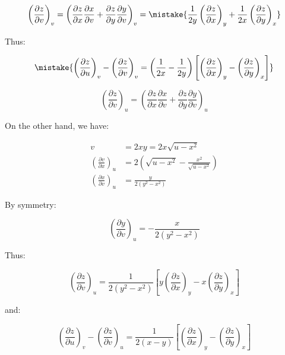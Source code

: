 \documentclass[12pt]{article}
\begin{document}

\begin{equation}
    \left( \frac{\partial z}{\partial v} \right)_{v} = \left( \frac{\partial z}{\partial x} \frac{\partial x}{\partial v} + \frac{\partial z}{\partial y} \frac{\partial y}{\partial v} \right)_{v} = \mistake{\frac{1}{2y} \left( \frac{\partial z}{\partial x} \right)_{y} + \frac{1}{2x} \left( \frac{\partial z}{\partial y} \right)_{x}}
\end{equation}

Thus:

\begin{equation}
    \mistake{\left( \frac{\partial z}{\partial u} \right)_{v} - \left( \frac{\partial z}{\partial v} \right)_{v} = \left( \frac{1}{2x} - \frac{1}{2y} \right) \left[ \left( \frac{\partial z}{\partial x} \right)_{y} - \left( \frac{\partial z}{\partial y} \right)_{x} \right]}
\end{equation}

\begin{correction}
    \begin{equation}
        \left( \frac{\partial z}{\partial v} \right)_{u} = \left( \frac{\partial z}{\partial x} \frac{\partial x}{\partial v} + \frac{\partial z}{\partial y} \frac{\partial y}{\partial v} \right)_{u}
    \end{equation}

    On the other hand, we have:

    \begin{equation}
        \begin{split}
            v &= 2xy = 2x \sqrt{u - x^{2}} \\
            \left( \frac{\partial v}{\partial x} \right)_{u} &= 2\left( \sqrt{u - x^{2}} - \frac{x^{2}}{\sqrt{u - x^{2}}} \right) \\
            \left( \frac{\partial x}{\partial v} \right)_{u} &= \frac{y}{2(y^{2} - x^{2})}
        \end{split}
    \end{equation}

    By symmetry:

    \begin{equation}
        \left( \frac{\partial y}{\partial v} \right)_{u} = -\frac{x}{2(y^{2} - x^{2})}
    \end{equation}

    Thus:

    \begin{equation}
        \left( \frac{\partial z}{\partial v} \right)_{u} = \frac{1}{2(y^{2} - x^{2})} \left[ y \left( \frac{\partial z}{\partial x} \right)_{y} - x \left( \frac{\partial z}{\partial y} \right)_{x} \right]
    \end{equation}

    and:

    \begin{equation}
        \left( \frac{\partial z}{\partial u} \right)_{v} - \left( \frac{\partial z}{\partial v} \right)_{u} = \frac{1}{2(x - y)} \left[ \left( \frac{\partial z}{\partial x} \right)_{y} - \left( \frac{\partial z}{\partial y} \right)_{x} \right]
    \end{equation}
\end{correction}
\end{document}
